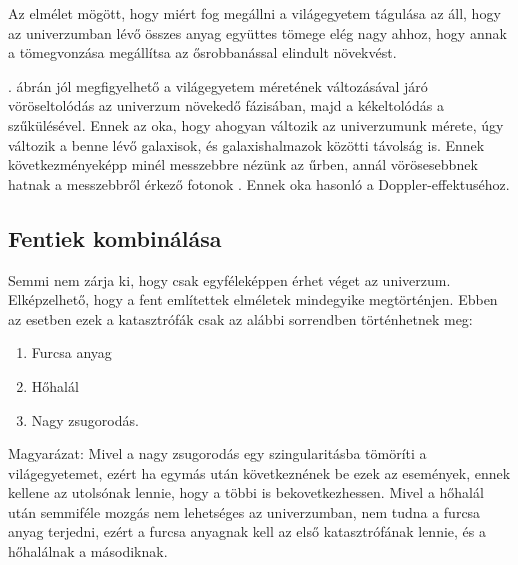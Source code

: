 \documentclass[a4paper]{article}
\begin{document}
Az elmélet mögött, hogy miért fog megállni a világegyetem tágulása az áll, hogy az univerzumban lévő összes anyag együttes tömege elég nagy ahhoz, hogy annak a tömegvonzása megállítsa az ősrobbanással elindult növekvést.\cite{big}
\par
{
    \footnotesize
    . ábrán jól megfigyelhető a világegyetem méretének változásával járó vöröseltolódás az univerzum növekedő fázisában, majd a kékeltolódás a szűkülésével. Ennek az oka, hogy ahogyan változik az univerzumunk mérete, úgy változik a benne lévő galaxisok, és galaxishalmazok közötti távolság is. Ennek következményeképp minél messzebbre nézünk az űrben, annál vörösesebbnek hatnak a messzebbről érkező fotonok \cite{redshift}. Ennek oka hasonló a Doppler-effektuséhoz. \cite{doppler}
}

\subsection*{Fentiek kombinálása}
Semmi nem zárja ki, hogy csak egyféleképpen érhet véget az univerzum. Elképzelhető, hogy a fent említettek elméletek mindegyike megtörténjen. Ebben az esetben ezek a katasztrófák csak az alábbi sorrendben történhetnek meg:
\begin{enumerate}
        \item Furcsa anyag
        \item Hőhalál
        \item Nagy zsugorodás.
\end{enumerate}
\par
{
\footnotesize
    Magyarázat: Mivel a nagy zsugorodás egy szingularitásba tömöríti a világegyetemet, ezért ha egymás után következnének be ezek az események, ennek kellene az utolsónak lennie, hogy a többi is bekovetkezhessen. Mivel a hőhalál után semmiféle mozgás nem lehetséges az univerzumban, nem tudna a furcsa anyag terjedni, ezért a furcsa anyagnak kell az első katasztrófának lennie, és a hőhalálnak a másodiknak.
}

\printbibliography
\end{document}
